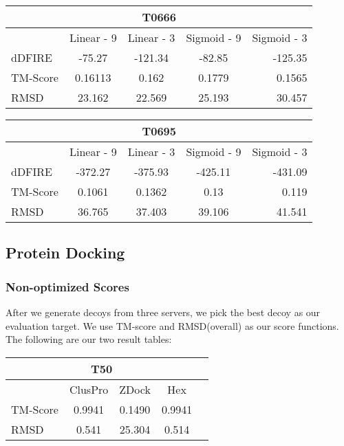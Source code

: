 \documentclass{article}
\begin{document}
\begin{center}
\begin{tabular}{|l|c|c|c|r|}
\multicolumn{5}{c}{T0666} \\
    \hline
      & Linear - 9 & Linear - 3 & Sigmoid - 9 & Sigmoid - 3\\ \hline
    dDFIRE & -75.27 & -121.34 & -82.85 & -125.35 \\ \hline
    TM-Score & 0.16113 & 0.162 & 0.1779 & 0.1565 \\ \hline
    RMSD & 23.162 & 22.569 & 25.193 & 30.457 \\
    \hline
    \end{tabular}
\end{center}

\begin{center}
\begin{tabular}{|l|c|c|c|r|}
\multicolumn{5}{c}{T0695} \\
    \hline
      & Linear - 9 & Linear - 3 & Sigmoid - 9 & Sigmoid - 3\\ \hline
    dDFIRE &  -372.27 & -375.93 & -425.11 & -431.09 \\ \hline
    TM-Score & 0.1061 & 0.1362 & 0.13 & 0.119 \\ \hline
    RMSD & 36.765 & 37.403 & 39.106 & 41.541 \\
    \hline
    \end{tabular}
\end{center}


\subsection{Protein Docking}

\subsubsection*{Non-optimized Scores}

After we generate decoys from three servers, we pick the best decoy as our evaluation target. We use TM-score and RMSD(overall) as our score functions. The following are our two result tables:

\begin{center}
\begin{tabular}{|l|c|c|c|r|}
\multicolumn{4}{c}{T50} \\
    \hline
      & ClusPro & ZDock & Hex \\ \hline
    TM-Score & 0.9941 & 0.1490 & 0.9941 \\ \hline
    RMSD & 0.541 & 25.304 & 0.514 \\
    \hline
    \end{tabular}
\end{center}
\end{document}
